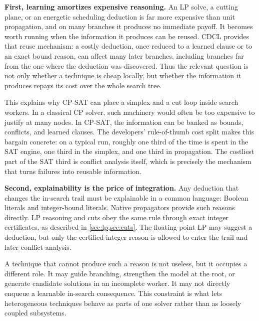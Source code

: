 \textbf{First, learning amortizes expensive reasoning.} An LP solve, a cutting
plane, or an energetic scheduling deduction is far more expensive than unit
propagation, and on many branches it produces no immediate payoff. It becomes
worth running when the information it produces can be reused. CDCL provides that
reuse mechanism: a costly deduction, once reduced to a learned clause or to an
exact bound reason, can affect many later branches, including branches far from
the one where the deduction was discovered. Thus the relevant question is not
only whether a technique is cheap locally, but whether the information it
produces repays its cost over the whole search tree.

This explains why CP-SAT can place a simplex and a cut loop inside search
workers. In a classical CP solver, such machinery would often be too expensive
to justify at many nodes. In CP-SAT, the information can be banked as bounds,
conflicts, and learned clauses. The developers' rule-of-thumb cost split makes
this bargain concrete: on a typical run, roughly one third of the time is spent
in the SAT engine, one third in the simplex, and one third in propagation. The
costliest part of the SAT third is conflict analysis itself, which is precisely
the mechanism that turns failures into reusable information.

\textbf{Second, explainability is the price of integration.} Any deduction that
changes the in-search trail must be explainable in a common language: Boolean
literals and integer-bound literals. Native propagators provide such reasons
directly. LP reasoning and cuts obey the same rule through exact integer
certificates, as described in \cref{sec:lp,sec:cuts}. The
floating-point LP may suggest a deduction, but only the certified integer reason
is allowed to enter the trail and later conflict analysis.

A technique that cannot produce such a reason is not useless, but it occupies a
different role. It may guide branching, strengthen the model at the root, or
generate candidate solutions in an incomplete worker. It may not directly enqueue
a learnable in-search consequence. This constraint is what lets heterogeneous
techniques behave as parts of one solver rather than as loosely coupled
subsystems.

